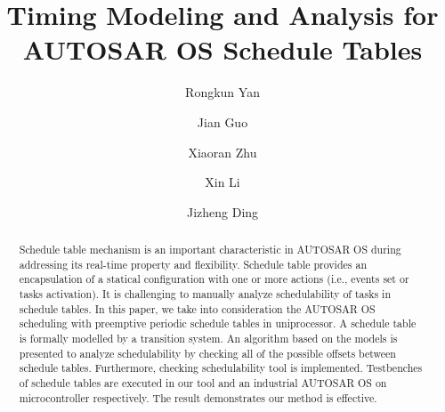 \documentclass[sigconf]{acmart}
\begin{document}
\title{Timing Modeling and Analysis for AUTOSAR OS Schedule Tables}


\author{Rongkun Yan}

\author{Jian Guo}

\author{Xiaoran Zhu}

\author{Xin Li}

\author{Jizheng Ding}





\begin{abstract}
Schedule table mechanism is an important characteristic in AUTOSAR OS during addressing its real-time property and flexibility. Schedule table provides an encapsulation of a statical configuration with one or more actions (i.e., events set or tasks activation). It is challenging to manually analyze schedulability of tasks in schedule tables. In this paper, we take into consideration the AUTOSAR OS scheduling with preemptive periodic schedule tables in uniprocessor. A schedule table is formally modelled by a transition system.
An algorithm based on the models is presented to analyze schedulability by checking all of the possible offsets between schedule tables.
Furthermore, checking schedulability tool is implemented. Testbenches of schedule tables are executed in our tool and an industrial AUTOSAR OS on microcontroller respectively. The result demonstrates our method is effective.
\end{abstract}

%
%
\end{document}
